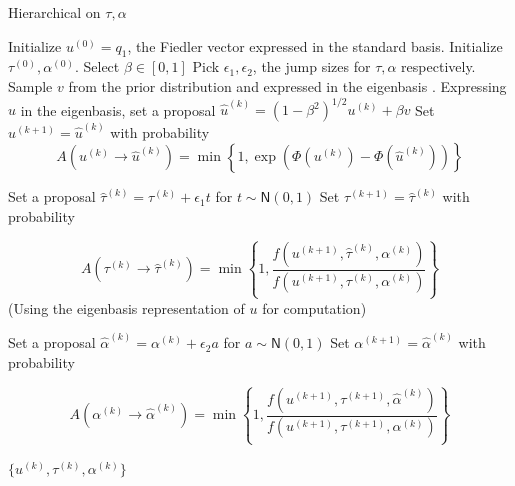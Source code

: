 \documentclass{siamart1116}
\begin{document}
\begin{algorithm}
\caption{Hierarchical on $\tau, \alpha$}
\label{alg:hierarchical_tau_alpha}
\begin{algorithmic}
\State Initialize $u^{(0)} = q_1$, the Fiedler vector expressed in the standard basis.
\State Initialize $\tau^{(0)}, \alpha^{(0)}$. Select $\beta \in [0, 1]$
\State Pick $\epsilon_1, \epsilon_2$, the jump sizes for $\tau, \alpha$ respectively.
\State Sample $v$ from the prior distribution and expressed in the eigenbasis .
\State Expressing $u$ in the eigenbasis, set a proposal $\hat u^{(k)} = (1- \beta^2)^{1/2}u^{(k)} + \beta v$
\State Set $u^{(k+1)} = \hat u^{(k)}$ with probability 
\[A(u^{(k)} \to \hat u^{(k)}) = \min \left\{1, \exp(\Phi(u^{(k)}) - \Phi(\hat u^{(k)})) \right\}\]

\State Set a proposal $\hat \tau^{(k)} = \tau^{(k)} + \epsilon_1 t$ for $t \sim \mathsf{N}(0, 1)$ 
\State Set $\tau^{(k+1)} = \hat \tau^{(k)}$ with probability 

\[A(\tau^{(k)} \to \hat \tau^{(k)}) = \min \left\{ 1, \frac{f(u^{(k+1)}, \hat \tau^{(k)}, \alpha^{(k)})}{f(u^{(k+1)}, \tau^{(k)}, \alpha^{(k)})}\right\}\]
(Using the eigenbasis representation of $u$ for computation) 

\State Set a proposal $\hat \alpha^{(k)} = \alpha^{(k)} + \epsilon_2 a$ for $a \sim \mathsf{N}(0, 1)$ 
\State Set $\alpha^{(k+1)} = \hat \alpha^{(k)}$ with probability

 \[A(\alpha^{(k)}\to\hat\alpha^{(k)}) = 
 \min\left\{1, 
 \frac{f(u^{(k+1)}, \tau^{(k+1)}, \hat \alpha^{(k)})}
 {f(u^{(k+1)}, \tau^{(k+1)}, \alpha^{(k)})}\right\}
 \]


\EndFor
\State \Return $\{u^{(k)}, \tau^{(k)}, \alpha^{(k)}\}$
\end{algorithmic}
\end{algorithm}
\end{document}
